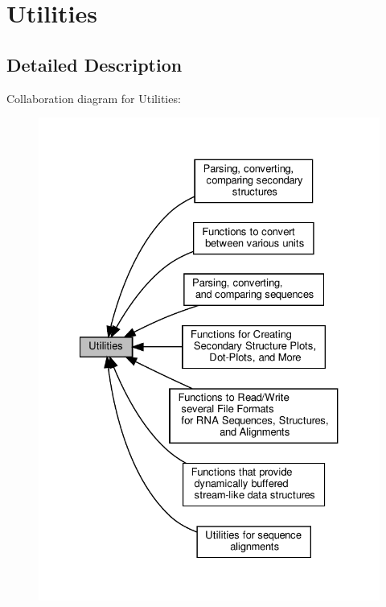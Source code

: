 \hypertarget{group__utils}{}\section{Utilities}
\label{group__utils}


\subsection{Detailed Description}
Collaboration diagram for Utilities\+:
\nopagebreak
\begin{figure}[H]
\begin{center}
\leavevmode
\includegraphics[width=327pt]{group__utils}
\end{center}
\end{figure}
